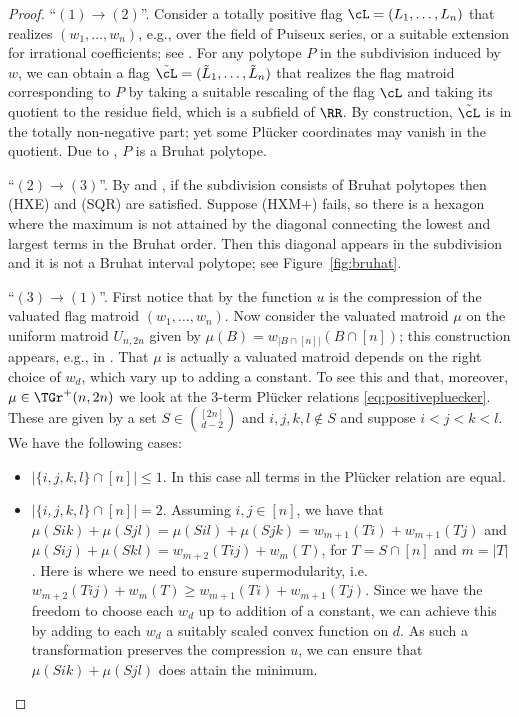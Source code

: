\begin{proof}
	\enquote{$(1)\rightarrow (2)$}.
	Consider a totally positive flag $\cL=(L_1,\dots, L_n)$ that realizes $(w_1,\dots,w_n)$, e.g., over the field of Puiseux series, or a suitable extension for irrational coefficients; see \cite[\S2.6]{ETC}.
	For any polytope $P$ in the subdivision induced by $w$, we can obtain a flag $\tilde{\cL} =(\tilde{L}_1,\dots,\tilde{L}_n)$ that realizes the flag matroid corresponding to $P$ by taking a suitable rescaling of the flag $\cL$ and taking its quotient to the residue field, which is a subfield of $\RR$. 
	By construction, $\tilde{\cL}$ is in the totally non-negative part; yet some Pl\"ucker coordinates may vanish in the quotient. 
	Due to , $P$ is a Bruhat polytope.
	
	\enquote{$(2) \rightarrow (3)$}.
	By  and , if the subdivision consists of Bruhat polytopes then (HXE) and (SQR) are satisfied.
	Suppose (HXM+) fails, so there is a hexagon where the maximum is not attained by the diagonal connecting the lowest and largest terms in the Bruhat order. 
	Then this diagonal appears in the subdivision and it is not a Bruhat interval polytope; see Figure~\ref{fig:bruhat}. 
	
	\enquote{$(3) \rightarrow (1)$}.
	First notice that by  the function $u$ is the compression of the valuated flag matroid $(w_1,\dots, w_n)$. 
	Now consider the valuated matroid $\mu$ on the uniform matroid $U_{n,2n}$ given by $\mu(B) = w_{|B\cap[n]|}(B\cap[n])$; this construction appears, e.g., in \cite{MurotaShioura-conjugate:2018}. 
	That $\mu$ is actually a valuated matroid depends on the right choice of $w_d$, which vary up to adding a constant. 
	To see this and that, moreover, $\mu \in \TGr^+(n,2n)$ we look at the 3-term Pl\"ucker relations \eqref{eq:positivepluecker}. 
	These are given by a set $S\in \binom{[2n]}{d-2}$ and $i,j,k,l \notin S$ and suppose $i< j<k< l$.
	We have the following cases:
	\begin{itemize}
		\item $|\{i,j,k,l\}\cap[n]| \le 1$. In this case all terms in the Pl\"ucker relation are equal.
		\item $|\{i,j,k,l\}\cap[n]| = 2$. Assuming $i,j \in [n]$, we have that $\mu(Sik) +\mu(Sjl)= \mu(Sil)+\mu(Sjk) = w_{m+1}(Ti) + w_{m+1}(Tj)$ and $\mu(Sij)+\mu(Skl) = w_{m+2}(Tij)+w_{m}(T)$, for $T = S \cap [n]$ and $m = |T|$.
			Here is where we need to ensure supermodularity, i.e. $w_{m+2}(Tij)+w_{m}(T) \ge w_{m+1}(Ti) + w_{m+1}(Tj)$. 
      Since we have the freedom to choose each $w_d$ up to addition of a constant, we can achieve this by adding to each $w_d$ a suitably scaled convex function on $d$. %
		  As such a transformation preserves the compression $u$, we can ensure that $\mu(Sik) +\mu(Sjl)$ does attain the minimum.
                  

\end{itemize}
\end{proof}
